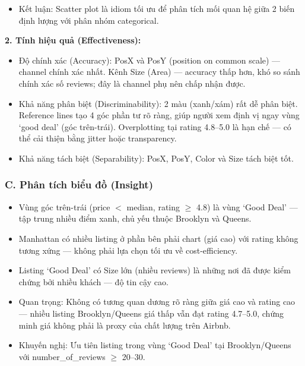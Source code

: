 \begin{itemize}
\begin{itemize}
        \item Ưu tiên 3 -- Kích thước điểm (Size / Area): Size mã hóa Number of Reviews (Quantitative) --- listing có nhiều review tương ứng với điểm lớn hơn. Theo Mackinlay, Area không phải kênh mạnh nhất cho dữ liệu định lượng về độ chính xác, nhưng đây là kênh phụ với mục tiêu encode độ tin cậy (trust level) thay vì giá trị chính xác: người xem không cần biết số review cụ thể, chỉ cần nhận biết listing nào ``đã được nhiều người kiểm chứng'' để củng cố độ tin tưởng vào Good Deal được phát hiện.
    \end{itemize}
    \item Kết luận: Scatter plot là idiom tối ưu để phân tích mối quan hệ giữa 2 biến định lượng với phân nhóm categorical.
\end{itemize}

\textbf{2. Tính hiệu quả (Effectiveness):}

\begin{itemize}
    \item Độ chính xác (Accuracy): PosX và PosY (position on common scale) --- channel chính xác nhất. Kênh Size (Area) --- accuracy thấp hơn, khó so sánh chính xác số reviews; đây là channel phụ nên chấp nhận được.
    \item Khả năng phân biệt (Discriminability): 2 màu (xanh/xám) rất dễ phân biệt. Reference lines tạo 4 góc phần tư rõ ràng, giúp người xem định vị ngay vùng `good deal' (góc trên-trái). Overplotting tại rating 4.8--5.0 là hạn chế --- có thể cải thiện bằng jitter hoặc transparency.
    \item Khả năng tách biệt (Separability): PosX, PosY, Color và Size tách biệt tốt.
\end{itemize}

\subsubsection*{C. Phân tích biểu đồ (Insight)}

\begin{itemize}
    \item Vùng góc trên-trái (price $<$ median, rating $\geq$ 4.8) là vùng `Good Deal' --- tập trung nhiều điểm xanh, chủ yếu thuộc Brooklyn và Queens.
    \item Manhattan có nhiều listing ở phần bên phải chart (giá cao) với rating không tương xứng --- không phải lựa chọn tối ưu về cost-efficiency.
    \item Listing `Good Deal' có Size lớn (nhiều reviews) là những nơi đã được kiểm chứng bởi nhiều khách --- độ tin cậy cao.
    \item Quan trọng: Không có tương quan dương rõ ràng giữa giá cao và rating cao --- nhiều listing Brooklyn/Queens giá thấp vẫn đạt rating 4.7--5.0, chứng minh giá không phải là proxy của chất lượng trên Airbnb.
    \item Khuyến nghị: Ưu tiên listing trong vùng `Good Deal' tại Brooklyn/Queens với number\_of\_reviews $\geq$ 20--30.
\end{itemize}
